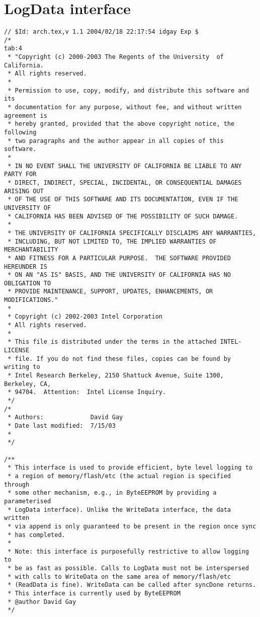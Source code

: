 \documentclass{article}
\begin{document}
\section{LogData interface}
\begin{verbatim}
// $Id: arch.tex,v 1.1 2004/02/18 22:17:54 idgay Exp $
/*                                                                      tab:4
 * "Copyright (c) 2000-2003 The Regents of the University  of California.  
 * All rights reserved.
 *
 * Permission to use, copy, modify, and distribute this software and its
 * documentation for any purpose, without fee, and without written agreement is
 * hereby granted, provided that the above copyright notice, the following
 * two paragraphs and the author appear in all copies of this software.
 * 
 * IN NO EVENT SHALL THE UNIVERSITY OF CALIFORNIA BE LIABLE TO ANY PARTY FOR
 * DIRECT, INDIRECT, SPECIAL, INCIDENTAL, OR CONSEQUENTIAL DAMAGES ARISING OUT
 * OF THE USE OF THIS SOFTWARE AND ITS DOCUMENTATION, EVEN IF THE UNIVERSITY OF
 * CALIFORNIA HAS BEEN ADVISED OF THE POSSIBILITY OF SUCH DAMAGE.
 * 
 * THE UNIVERSITY OF CALIFORNIA SPECIFICALLY DISCLAIMS ANY WARRANTIES,
 * INCLUDING, BUT NOT LIMITED TO, THE IMPLIED WARRANTIES OF MERCHANTABILITY
 * AND FITNESS FOR A PARTICULAR PURPOSE.  THE SOFTWARE PROVIDED HEREUNDER IS
 * ON AN "AS IS" BASIS, AND THE UNIVERSITY OF CALIFORNIA HAS NO OBLIGATION TO
 * PROVIDE MAINTENANCE, SUPPORT, UPDATES, ENHANCEMENTS, OR MODIFICATIONS."
 *
 * Copyright (c) 2002-2003 Intel Corporation
 * All rights reserved.
 *
 * This file is distributed under the terms in the attached INTEL-LICENSE     
 * file. If you do not find these files, copies can be found by writing to
 * Intel Research Berkeley, 2150 Shattuck Avenue, Suite 1300, Berkeley, CA, 
 * 94704.  Attention:  Intel License Inquiry.
 */
/*
 * Authors:             David Gay
 * Date last modified:  7/15/03
 *
 */

/** 
 * This interface is used to provide efficient, byte level logging to
 * a region of memory/flash/etc (the actual region is specified through
 * some other mechanism, e.g., in ByteEEPROM by providing a parameterised
 * LogData interface). Unlike the WriteData interface, the data written
 * via append is only guaranteed to be present in the region once sync
 * has completed.
 *
 * Note: this interface is purposefully restrictive to allow logging to
 * be as fast as possible. Calls to LogData must not be interspersed
 * with calls to WriteData on the same area of memory/flash/etc
 * (ReadData is fine). WriteData can be called after syncDone returns.
 * This interface is currently used by ByteEEPROM
 * @author David Gay
 */


\end{verbatim}
\end{document}
